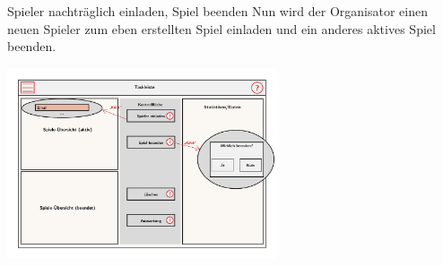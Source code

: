 \documentclass[xcolor=dvipsnames]{beamer}
\begin{document}
    \begin{frame}
        \begin{block} {Spieler nachträglich einladen, Spiel beenden}
            Nun wird der Organisator einen neuen Spieler zum eben erstellten Spiel einladen und ein anderes aktives Spiel beenden.
        \end{block}
        \includegraphics[width=8cm]{img/OrganisatorPres2.jpg}
    \end{frame}
\end{document}

